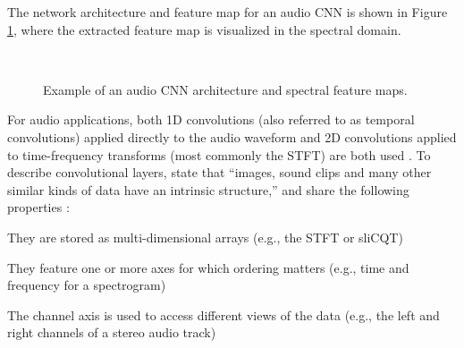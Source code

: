 \documentclass[report.tex]{subfiles}
\begin{document}
The network architecture and feature map for an audio CNN is shown in Figure \ref{fig:audiocnn}, where the extracted feature map is visualized in the spectral domain.

\begin{figure}[ht]
	\centering
	\\
	\caption{Example of an audio CNN architecture and spectral feature maps.}
	\label{fig:audiocnn}
\end{figure}

For audio applications, both 1D convolutions (also referred to as temporal convolutions) applied directly to the audio waveform and 2D convolutions applied to time-frequency transforms (most commonly the STFT) are both used \parencite{tcn, 2dconv}. To describe convolutional layers, \citeauthor{convguide} state that ``images, sound clips and many other similar kinds of data have an intrinsic structure,'' and share the following properties \parencite[6]{convguide}:

\begin{tight_enumerate}
	\item
		They are stored as multi-dimensional arrays (e.g., the STFT or sliCQT)
	\item
		They feature one or more axes for which ordering matters (e.g., time and frequency for a spectrogram)
	\item
		The channel axis is used to access different views of the data (e.g., the left and right channels of a stereo audio track)
\end{tight_enumerate}
\end{document}
